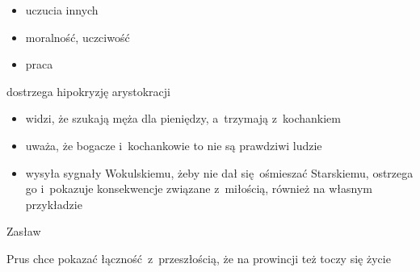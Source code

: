 \begin{description}
\begin{description}
\begin{itemize}
                    \item uczucia innych
                    \item moralność, uczciwość
                    \item praca
                \end{itemize}
            \item dostrzega hipokryzję arystokracji
                \begin{itemize}
                    \item widzi, że szukają męża dla pieniędzy, a~trzymają z~kochankiem
                    \item uważa, że bogacze i~kochankowie to nie są prawdziwi ludzie
                    \item wysyła sygnały Wokulskiemu, żeby nie dał się ośmieszać Starskiemu, ostrzega go i~pokazuje konsekwencje związane z~miłością, również na własnym przykładzie
                \end{itemize}
        \end{description}
    \item Zasław
        \begin{description}
            \item Prus chce pokazać łączność z~przeszłością, że na prowincji też toczy się życie
        \end{description}
\end{description}
